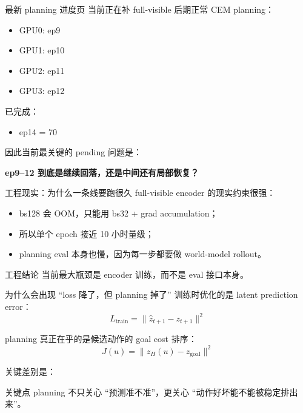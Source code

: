 \documentclass[aspectratio=169,11pt]{beamer}
\begin{document}
\begin{frame}{最新 planning 进度页}
  当前正在补 full-visible 后期正常 CEM planning：
  \begin{itemize}
    \item GPU0: ep9
    \item GPU1: ep10
    \item GPU2: ep11
    \item GPU3: ep12
  \end{itemize}

  \vspace{0.6em}
  已完成：
  \begin{itemize}
    \item ep14 = 70
  \end{itemize}

  \vspace{0.6em}
  因此当前最关键的 pending 问题是：
  \begin{center}
    \textbf{ep9--12 到底是继续回落，还是中间还有局部恢复？}
  \end{center}
\end{frame}

\begin{frame}{工程现实：为什么一条线要跑很久}
  full-visible encoder 的现实约束很强：
  \begin{itemize}
    \item bs128 会 OOM，只能用 bs32 + grad accumulation；
    \item 所以单个 epoch 接近 10 小时量级；
    \item planning eval 本身也慢，因为每一步都要做 world-model rollout。
  \end{itemize}

  \begin{block}{工程结论}
    当前最大瓶颈是 encoder 训练，而不是 eval 接口本身。
  \end{block}
\end{frame}

\begin{frame}{为什么会出现 ``loss 降了，但 planning 掉了''}
  训练时优化的是 latent prediction error：
  \[
    L_{\text{train}}=\|\hat z_{t+1}-z_{t+1}\|^2
  \]

  planning 真正在乎的是候选动作的 goal cost 排序：
  \[
    J(u)=\|z_H(u)-z_{\text{goal}}\|^2
  \]

  关键差别是：
  \begin{block}{关键点}
    planning 不只关心 ``预测准不准''，更关心 ``动作好坏能不能被稳定排出来''。
  \end{block}
\end{frame}
\end{document}
